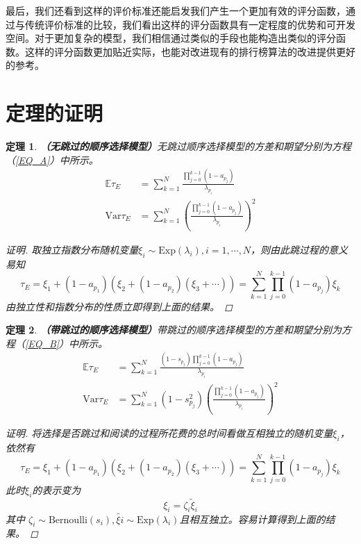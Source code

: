 \documentclass[UTF8]{ctexart}
\theoremstyle{plain}
\newtheorem{thm}{定理}[section]
\theoremstyle{definition}
\theoremstyle{remark}
\begin{document}
	最后，我们还看到这样的评价标准还能启发我们产生一个更加有效的评分函数，通过与传统评价标准的比较，我们看出这样的评分函数具有一定程度的优势和可开发空间。对于更加复杂的模型，我们相信通过类似的手段也能构造出类似的评分函数。这样的评分函数更加贴近实际，也能对改进现有的排行榜算法的改进提供更好的参考。
	
	
	
	
	\newpage
	\appendix
	\section{定理的证明}
	\begin{thm}\textbf{（无跳过的顺序选择模型）}无跳过顺序选择模型的方差和期望分别为方程（\ref{EQ_A}）中所示。
		\begin{equation*}
		\begin{aligned}
		\mathbb{E} \tau_E & = \sum_{k=1}^N \frac{\prod\limits_{j=0}^{k-1}(1-a_{p_j})}{\lambda_{p_i}} \\
		\mathrm{Var} \tau_E & = \sum_{k=1}^N \left(\frac{\prod\limits_{j=0}^{k-1}(1-a_{p_j})}{\lambda_{p_i}}\right)^2
		\end{aligned}
		\end{equation*}
	\begin{proof}[证明]
		取独立指数分布随机变量$\xi_i \sim \mathrm{Exp}(\lambda_i), i = 1, \cdots, N$，则由此跳过程的意义易知
		$$
		\tau_E = \xi_1 + (1-a_{p_1})(\xi_2 + (1-a_{p_2})(\xi_3+\cdots)) = \sum_{k=1}^N \prod_{j=0}^{k-1} (1-a_{p_j}) \xi_k
		$$
		由独立性和指数分布的性质立即得到上面的结果。
	\end{proof}
	\end{thm}
	\begin{thm}\textbf{（带跳过的顺序选择模型）}带跳过的顺序选择模型的方差和期望分别为方程（\ref{EQ_B}）中所示。
		\begin{equation*}
		\begin{aligned}
		\mathbb{E} \tau_E & = \sum_{k=1}^N \frac{(1-s_{p_j})\prod\limits_{j=0}^{k-1}(1-a_{p_j})}{\lambda_{p_i}} \\
		\mathrm{Var} \tau_E & = \sum_{k=1}^N (1-s_{p_j}^2)\left(\frac{\prod\limits_{j=0}^{k-1}(1-a_{p_j})}{\lambda_{p_i}}\right)^2
		\end{aligned}
		\end{equation*}
		\begin{proof}[证明]
			将选择是否跳过和阅读的过程所花费的总时间看做互相独立的随机变量$\xi_i$，依然有
			$$
			\tau_E = \xi_1 + (1-a_{p_1})(\xi_2 + (1-a_{p_2})(\xi_3+\cdots)) = \sum_{k=1}^N \prod_{j=0}^{k-1} (1-a_{p_j}) \xi_k
			$$
			此时$\xi_i$的表示变为
			$$
			\xi_i = \zeta_i \tilde{\xi}_i
			$$
			其中
			$\zeta_i \sim \mathrm{Bernoulli}(s_i), \tilde{\xi{i}} \sim \mathrm{Exp}(\lambda_i)$且相互独立。容易计算得到上面的结果。
		\end{proof}
	\end{thm}
\end{document}
